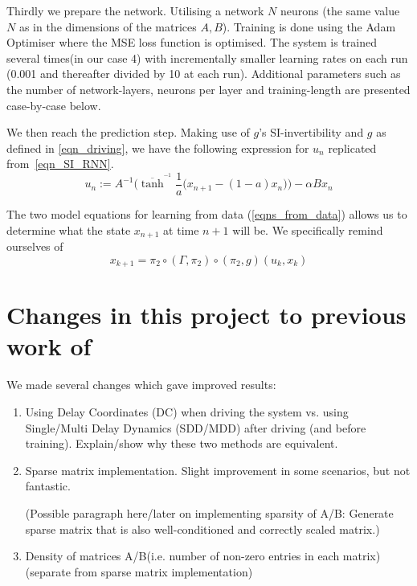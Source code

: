 \documentclass[a4paper,12pt,twoside]{report}
\begin{document}
Thirdly we prepare the network. Utilising a network $N$ neurons (the same value $N$ as in the dimensions of the matrices $A,B$). Training is done using the Adam Optimiser where the MSE loss function is optimised. The system is trained several times(in our case 4) with incrementally smaller learning rates on each run (0.001 and thereafter divided by 10 at each run). 
Additional parameters such as the number of network-layers, neurons per layer and training-length are presented case-by-case below.

We then reach the prediction step. Making use of $g$'s SI-invertibility and $g$ as defined in \eqref{eqn_driving}, we have the following expression for $u_n$ replicated from~\eqref{eqn_SI_RNN}.
\begin{equation*}
  u_n := A^{-1}\bigg(\overline{\tanh}^{^{-1}}\frac{1}{a}\Big(x_{n+1}-(1-a)x_n\Big) \bigg) - \alpha B x_n
\end{equation*}
    
The two model equations for learning from data (\eqref{eqns_from_data}) allows us to determine what the state $x_{n+1}$ at time $n+1$ will be. 
We specifically remind ourselves of \[x_{k+1}=\pi_2 \circ (\Gamma, \pi_2) \circ (\pi_2,g) (u_k,x_k)\]

\section{Changes in this project to previous work of~\cite{manjunath2021universal}}

We made several changes which gave improved results:
\vspace{-8mm}
\begin{enumerate}
\item Using Delay Coordinates (DC) when driving the system vs. using Single/Multi Delay Dynamics (SDD/MDD) after driving (and before training). Explain/show why these two methods are equivalent. 
\item Sparse matrix implementation. Slight improvement in some scenarios, but not fantastic. 

(Possible paragraph here/later on implementing sparsity of A/B: Generate sparse matrix that is also well-conditioned and correctly scaled matrix.)
\item Density of matrices A/B(i.e. number of non-zero entries in each matrix) (separate from sparse matrix implementation)
\end{enumerate}
\end{document}
